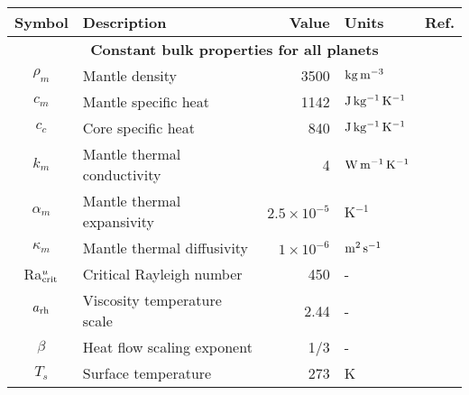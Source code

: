 \begin{table*}
\footnotesize
\begin{tabular}{@{} c l r l p{3.5cm} @{}}
\toprule
Symbol & Description & Value & Units & Ref. \\
\midrule
\multicolumn{5}{c}{\textbf{Constant bulk properties for all planets}} \\
$\rho_m$ & Mantle density & 3500 & $\rm{kg\,m^{-3}}$ &  \citet{thiriet_scaling_2019}  \\
$c_m$ & Mantle specific heat & 1142 & $\rm{J\,kg^{-1}\,K^{-1}}$ & \citet{thiriet_scaling_2019}  \\
$c_c$ & Core specific heat & 840 & $\rm{J\,kg^{-1}\,K^{-1}}$  & \citet{thiriet_scaling_2019}  \\
$k_m$ & Mantle thermal conductivity & 4 & $\rm{W\,m^{-1}\,K^{-1}}$ & \citet{thiriet_scaling_2019}  \\
$\alpha_m$ & Mantle thermal expansivity &  $2.5 \times 10^{-5}$ & K$^{-1}$  & \citet{thiriet_scaling_2019}  \\
$\kappa_m$ & Mantle thermal diffusivity &  $1 \times 10^{-6}$ & $\rm{m^{2}\,s^{-1}}$  & \citet{thiriet_scaling_2019}  \\
Ra$_{\rm crit}^{u}$ & Critical Rayleigh number & 450 & - & \citet{thiriet_scaling_2019}  \\
$a_{\rm rh}$ & Viscosity temperature scale & 2.44 & - & \citet{thiriet_scaling_2019} \\
$\beta$ & Heat flow scaling exponent & 1/3 & - & \citet{solomatov_scaling_1995} \\
$T_s$ & Surface temperature & 273 & K & \\


\end{tabular}
\end{table*}
